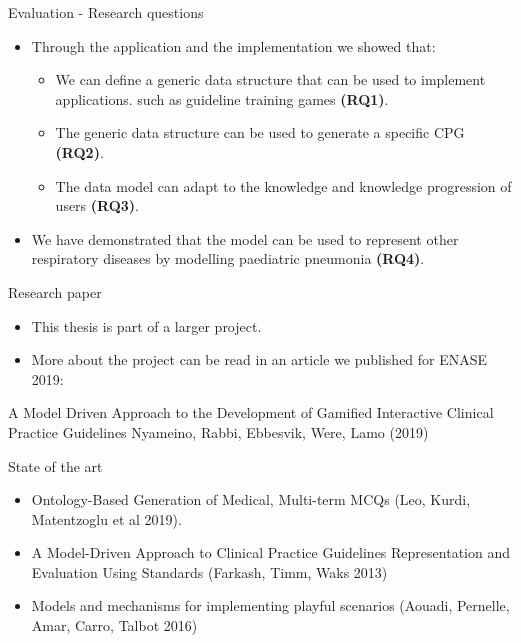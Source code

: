 \documentclass{beamer}
\begin{document}
\begin{frame}{Evaluation - Research questions}
\begin{itemize}
	\item Through the application and the implementation we showed that:
	\begin{itemize}
		\item We can define a generic data structure that can be used to implement applications. such as guideline training games \textbf{(RQ1)}.
		\item The generic data structure can be used to generate a specific CPG \textbf{(RQ2)}.
		\item The data model can adapt to the knowledge and knowledge progression of users \textbf{(RQ3)}.
	\end{itemize}
	\item We have demonstrated that the model can be used to represent other respiratory diseases by modelling paediatric pneumonia \textbf{(RQ4)}.
\end{itemize}
\end{frame}

\begin{frame}{Research paper}
\begin{itemize}
\item This thesis is part of a larger project.
\item More about the project can be read in an article we published for ENASE 2019:
\end{itemize}
 \begin{block}{}A Model Driven Approach to the Development of Gamified Interactive Clinical Practice Guidelines
\newline
Nyameino, Rabbi, Ebbesvik, Were, Lamo (2019)
\end{block}
\end{frame}

\begin{frame}{State of the art}
\begin{itemize}
	\item Ontology-Based Generation of Medical, Multi-term MCQs (Leo, Kurdi, Matentzoglu et al 2019).
	\item A Model-Driven Approach to Clinical Practice Guidelines Representation and Evaluation Using Standards (Farkash, Timm, Waks 2013)
	\item Models and mechanisms for implementing playful scenarios (Aouadi, Pernelle, Amar, Carro, Talbot 2016)
\end{itemize}
\end{frame}
\end{document}
